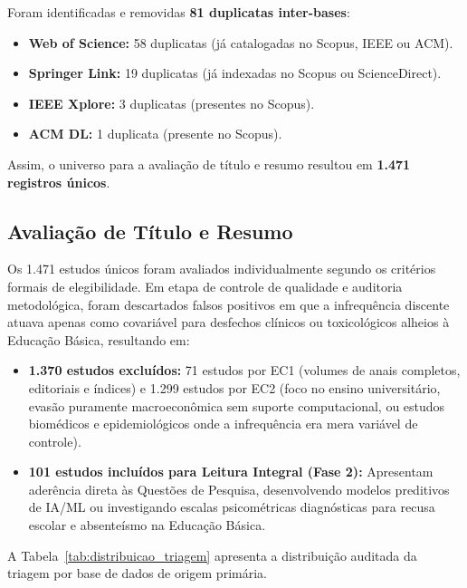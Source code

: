 \documentclass[journal,10pt,a4paper]{IEEEtran}
\begin{document}
Foram identificadas e removidas \textbf{81 duplicatas inter-bases}:
\begin{itemize}
    \item \textbf{Web of Science:} 58 duplicatas (já catalogadas no Scopus, IEEE ou ACM).
    \item \textbf{Springer Link:} 19 duplicatas (já indexadas no Scopus ou ScienceDirect).
    \item \textbf{IEEE Xplore:} 3 duplicatas (presentes no Scopus).
    \item \textbf{ACM DL:} 1 duplicata (presente no Scopus).
\end{itemize}
Assim, o universo para a avaliação de título e resumo resultou em \textbf{1.471 registros únicos}.

\subsection{Avaliação de Título e Resumo}
Os 1.471 estudos únicos foram avaliados individualmente segundo os critérios formais de elegibilidade. Em etapa de controle de qualidade e auditoria metodológica, foram descartados falsos positivos em que a infrequência discente atuava apenas como covariável para desfechos clínicos ou toxicológicos alheios à Educação Básica, resultando em:
\begin{itemize}
    \item \textbf{1.370 estudos excluídos:} 71 estudos por EC1 (volumes de anais completos, editoriais e índices) e 1.299 estudos por EC2 (foco no ensino universitário, evasão puramente macroeconômica sem suporte computacional, ou estudos biomédicos e epidemiológicos onde a infrequência era mera variável de controle).
    \item \textbf{101 estudos incluídos para Leitura Integral (Fase 2):} Apresentam aderência direta às Questões de Pesquisa, desenvolvendo modelos preditivos de IA/ML ou investigando escalas psicométricas diagnósticas para recusa escolar e absenteísmo na Educação Básica.
\end{itemize}

A Tabela~\ref{tab:distribuicao_triagem} apresenta a distribuição auditada da triagem por base de dados de origem primária.
\end{document}
